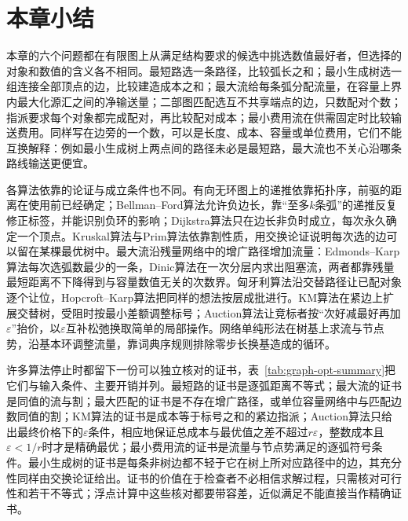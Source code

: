 
\section{本章小结}
\label{sec:graph-optimization-summary}

本章的六个问题都在有限图上从满足结构要求的候选中挑选数值最好者，但选择的对象和数值的含义各不相同。最短路选一条路径，比较弧长之和；最小生成树选一组连接全部顶点的边，比较建造成本之和；最大流给每条弧分配流量，在容量上界内最大化源汇之间的净输送量；二部图匹配选互不共享端点的边，只数配对个数；指派要求每个对象都完成配对，再比较配对成本；最小费用流在供需固定时比较输送费用。同样写在边旁的一个数，可以是长度、成本、容量或单位费用，它们不能互换解释：例如最小生成树上两点间的路径未必是最短路，最大流也不关心沿哪条路线输送更便宜。

各算法依靠的论证与成立条件也不同。有向无环图上的递推依靠拓扑序，前驱的距离在使用前已经确定；Bellman--Ford算法允许负边长，靠“至多$k$条弧”的递推反复修正标签，并能识别负环的影响；Dijkstra算法只在边长非负时成立，每次永久确定一个顶点。Kruskal算法与Prim算法依靠割性质，用交换论证说明每次选的边可以留在某棵最优树中。最大流沿残量网络中的增广路径增加流量：Edmonds--Karp算法每次选弧数最少的一条，Dinic算法在一次分层内求出阻塞流，两者都靠残量最短距离不下降得到与容量数值无关的次数界。匈牙利算法沿交替路径让已配对象逐个让位，Hopcroft--Karp算法把同样的想法按层成批进行。KM算法在紧边上扩展交替树，受阻时按最小差额调整标号；Auction算法让竞标者按“次好减最好再加$\varepsilon$”抬价，以$\varepsilon$互补松弛换取简单的局部操作。网络单纯形法在树基上求流与节点势，沿基本环调整流量，靠词典序规则排除零步长换基造成的循环。

许多算法停止时都留下一份可以独立核对的证书，表~\ref{tab:graph-opt-summary}把它们与输入条件、主要开销并列。最短路的证书是逐弧距离不等式；最大流的证书是同值的流与割；最大匹配的证书是不存在增广路径，或单位容量网络中与匹配边数同值的割；KM算法的证书是成本等于标号之和的紧边指派；Auction算法只给出最终价格下的$\varepsilon$条件，相应地保证总成本与最优值之差不超过$r\varepsilon$，整数成本且$\varepsilon<1/r$时才是精确最优；最小费用流的证书是流量与节点势满足的逐弧符号条件。最小生成树的证书是每条非树边都不轻于它在树上所对应路径中的边，其充分性同样由交换论证给出。证书的价值在于检查者不必相信求解过程，只需核对可行性和若干不等式；浮点计算中这些核对都要带容差，近似满足不能直接当作精确证书。

